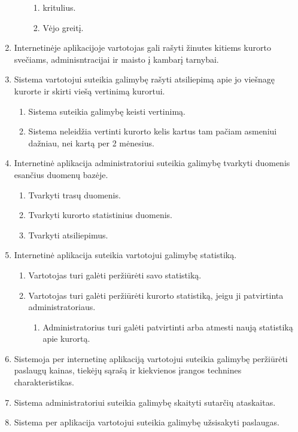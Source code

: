 \documentclass[oneside]{VUMIFPSkursinis}
\begin{document}
\begin{enumerate}
\begin{enumerate}
\begin{enumerate}
			\item kritulius.
			\item Vėjo greitį.
		\end{enumerate}
	\end{enumerate}
	\item Internetinėje aplikacijoje vartotojas gali rašyti žinutes kitiems kurorto svečiams, adminisntracijai ir maisto į kambarį tarnybai.
	\item Sistema vartotojui suteikia galimybę rašyti atsiliepimą apie jo viešnagę kurorte ir skirti viešą vertinimą kurortui.
	\begin{enumerate}
		\item Sistema suteikia galimybę keisti vertinimą.
		\item Sistema neleidžia vertinti kurorto kelis kartus tam pačiam asmeniui dažniau, nei kartą per 2 mėnesius.
	\end{enumerate}
	\item Internetinė aplikacija administratoriui suteikia galimybę tvarkyti duomenis esančius duomenų bazėje.
	\begin{enumerate}
		\item Tvarkyti trasų duomenis.
		\item Tvarkyti kurorto statistinius duomenis.
		\item Tvarkyti atsiliepimus.
	\end{enumerate}
	\item Internetinė aplikacija suteikia vartotojui galimybę statistiką.
	\begin{enumerate}
		\item Vartotojas turi galėti peržiūrėti savo statistiką.
		\item Vartotojas turi galėti peržiūrėti kurorto statistiką, jeigu ji patvirtinta administratoriaus.
		\begin{enumerate}
			\item Administratorius turi galėti patvirtinti arba atmesti naują statistiką apie kurortą.
		\end{enumerate}
	\end{enumerate}
	\item Sistemoja per internetinę aplikaciją vartotojui suteikia galimybę peržiūrėti paslaugų kainas, tiekėjų sąrašą ir kiekvienos įrangos technines charakteristikas.
	\item Sistema administratoriui suteikia galimybę skaityti sutarčių ataskaitas.
	\item Sistema per aplikacija vartotojui suteikia galimybę užsisakyti paslaugas.

\end{enumerate}
\end{document}
